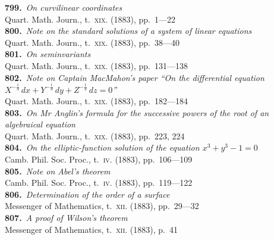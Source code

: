 \documentclass[11pt,a4paper]{article}
\providecommand{\textsc}[1]{{\scshape #1}}
\begin{document}
\small
\noindent\textbf{799.}~\textit{On curvilinear coordinates}~\\
\hspace*{2em}Quart. Math. Journ., t.~\textsc{xix}. (1883), pp.~1---22\\[0.3em]
\textbf{800.}~\textit{Note on the standard solutions of a system of linear equations}~\\
\hspace*{2em}Quart. Math. Journ., t.~\textsc{xix}. (1883), pp.~38---40\\[0.3em]
\textbf{801.}~\textit{On seminvariants}~\\
\hspace*{2em}Quart. Math. Journ., t.~\textsc{xix}. (1883), pp.~131---138\\[0.3em]
\textbf{802.}~\textit{Note on Captain MacMahon's paper ``On the differential equation
$X^{-\frac{1}{3}}\,dx + Y^{-\frac{1}{3}}\,dy + Z^{-\frac{1}{3}}\,dz = 0$''}~\\
\hspace*{2em}Quart. Math. Journ., t.~\textsc{xix}. (1883), pp.~182---184\\[0.3em]
\textbf{803.}~\textit{On Mr Anglin's formula for the successive powers of the root of an algebraical equation}~\\
\hspace*{2em}Quart. Math. Journ., t.~\textsc{xix}. (1883), pp.~223, 224\\[0.3em]
\textbf{804.}~\textit{On the elliptic-function solution of the equation $x^{3}+y^{3}-1=0$}~\\
\hspace*{2em}Camb. Phil. Soc. Proc., t.~\textsc{iv}. (1883), pp.~106---109\\[0.3em]
\textbf{805.}~\textit{Note on Abel's theorem}~\\
\hspace*{2em}Camb. Phil. Soc. Proc., t.~\textsc{iv}. (1883), pp.~119---122\\[0.3em]
\textbf{806.}~\textit{Determination of the order of a surface}~\\
\hspace*{2em}Messenger of Mathematics, t.~\textsc{xii}. (1883), pp.~29---32\\[0.3em]
\textbf{807.}~\textit{A proof of Wilson's theorem}~\\
\hspace*{2em}Messenger of Mathematics, t.~\textsc{xii}. (1883), p.~41
\end{document}
